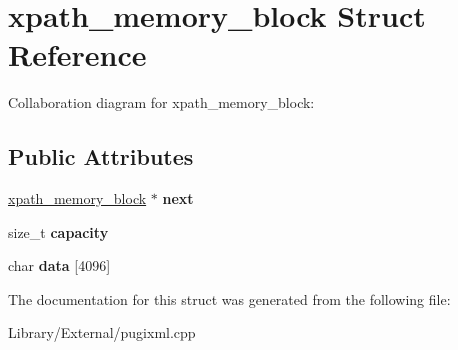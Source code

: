 \hypertarget{structxpath__memory__block}{}\section{xpath\+\_\+memory\+\_\+block Struct Reference}
\label{structxpath__memory__block}


Collaboration diagram for xpath\+\_\+memory\+\_\+block\+:
\subsection*{Public Attributes}
\begin{DoxyCompactItemize}
\item 
\hypertarget{structxpath__memory__block_ab7f0d8400b40a51cdb063e76fd19a93c}{}\hyperlink{structxpath__memory__block}{xpath\+\_\+memory\+\_\+block} $\ast$ {\bfseries next}\label{structxpath__memory__block_ab7f0d8400b40a51cdb063e76fd19a93c}

\item 
\hypertarget{structxpath__memory__block_ab3adef89fe1cb7c50ca6ce5708ff9316}{}size\+\_\+t {\bfseries capacity}\label{structxpath__memory__block_ab3adef89fe1cb7c50ca6ce5708ff9316}

\item 
\hypertarget{structxpath__memory__block_a7b00376d0eac172ab537b6b0964858a9}{}char {\bfseries data} \mbox{[}4096\mbox{]}\label{structxpath__memory__block_a7b00376d0eac172ab537b6b0964858a9}

\end{DoxyCompactItemize}


The documentation for this struct was generated from the following file\+:\begin{DoxyCompactItemize}
\item 
Library/\+External/pugixml.\+cpp\end{DoxyCompactItemize}

